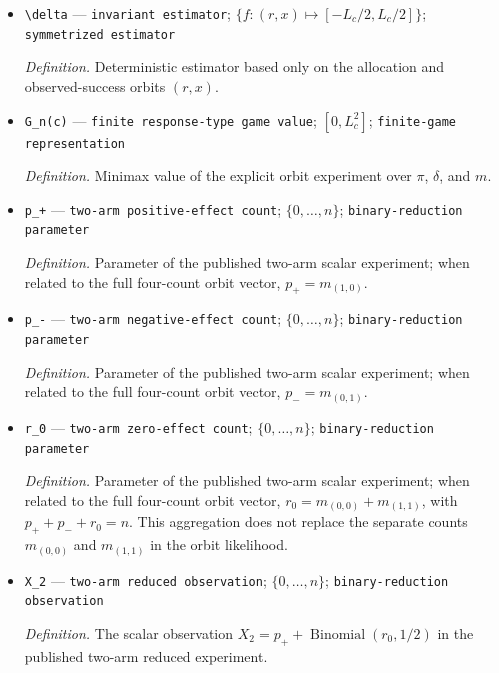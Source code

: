 \documentclass{article}
\begin{document}
\begin{itemize}
  \par\smallskip\noindent\emph{Definition.} \(\pi=(\pi_r)_{r\in\mathcal R_{n,K}}\) selects an allocation count and then assigns units uniformly conditional on that count.
  \item \texttt{\textbackslash{}\allowbreak{}delta} --- \texttt{invariant estimator}; \(\{f:(r,x)\mapsto[-L_c/2,L_c/2]\}\); \texttt{symmetrized estimator}
  \par\smallskip\noindent\emph{Definition.} Deterministic estimator based only on the allocation and observed-success orbits \((r,x)\).
  \item \texttt{G\_\allowbreak{}n(c)} --- \texttt{finite response-\allowbreak{}type game value}; \([0,L_c^2]\); \texttt{finite-\allowbreak{}game representation}
  \par\smallskip\noindent\emph{Definition.} Minimax value of the explicit orbit experiment over \(\pi\), \(\delta\), and \(m\).
  \item \texttt{p\_\allowbreak{}+\allowbreak{}} --- \texttt{two-\allowbreak{}arm positive-\allowbreak{}effect count}; \(\{0,\ldots,n\}\); \texttt{binary-\allowbreak{}reduction parameter}
  \par\smallskip\noindent\emph{Definition.} Parameter of the published two-arm scalar experiment; when related to the full four-count orbit vector, \(p_+=m_{(1,0)}\).
  \item \texttt{p\_\allowbreak{}-\allowbreak{}} --- \texttt{two-\allowbreak{}arm negative-\allowbreak{}effect count}; \(\{0,\ldots,n\}\); \texttt{binary-\allowbreak{}reduction parameter}
  \par\smallskip\noindent\emph{Definition.} Parameter of the published two-arm scalar experiment; when related to the full four-count orbit vector, \(p_-=m_{(0,1)}\).
  \item \texttt{r\_\allowbreak{}0} --- \texttt{two-\allowbreak{}arm zero-\allowbreak{}effect count}; \(\{0,\ldots,n\}\); \texttt{binary-\allowbreak{}reduction parameter}
  \par\smallskip\noindent\emph{Definition.} Parameter of the published two-arm scalar experiment; when related to the full four-count orbit vector, \(r_0=m_{(0,0)}+m_{(1,1)}\), with \(p_++p_-+r_0=n\). This aggregation does not replace the separate counts \(m_{(0,0)}\) and \(m_{(1,1)}\) in the orbit likelihood.
  \item \texttt{X\_\allowbreak{}2} --- \texttt{two-\allowbreak{}arm reduced observation}; \(\{0,\ldots,n\}\); \texttt{binary-\allowbreak{}reduction observation}
  \par\smallskip\noindent\emph{Definition.} The scalar observation \(X_2=p_++\operatorname{Binomial}(r_0,1/2)\) in the published two-arm reduced experiment.

\end{itemize}
\end{document}
